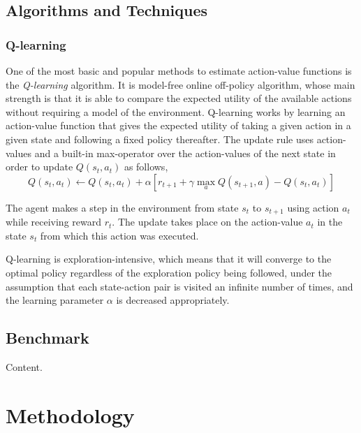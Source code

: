 \documentclass{article}
\begin{document}
\subsection{Algorithms and Techniques}

\subsubsection{Q-learning}

One of the most basic and popular methods to estimate action-value functions is the
\emph{Q-learning} algorithm. It is model-free online off-policy algorithm,
whose main strength is that it is able to compare the expected utility of the available actions
without requiring a model of the environment. Q-learning works by learning an action-value function
that gives the expected utility of taking a given action in a given state and following a fixed
policy thereafter. The update rule uses action-values and a built-in max-operator over the
action-values of the next state in order to update $Q(s_t, a_t)$ as follows,
%
\begin{equation}
    Q(s_t, a_t) \gets Q(s_t, a_t) + \alpha [r_{t+1} + \gamma \max_a Q(s_{t+1}, a) - Q(s_t, a_t)]
\end{equation}

The agent makes a step in the environment from state $s_t$ to $s_{t+1}$ using action $a_t$ while
receiving reward $r_t$. The update takes place on the action-value $a_t$ in the state $s_t$ from
which this action was executed.

Q-learning is exploration-intensive, which means that it will converge to the optimal policy
regardless of the exploration policy being followed, under the assumption that each state-action
pair is visited an infinite number of times, and the learning parameter $\alpha$ is decreased
appropriately.

\subsection{Benchmark}

Content.

\section{Methodology}
\end{document}
